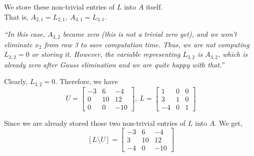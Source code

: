	We store these non-trivial entries of $L$ into $A$ itself.\\
	That is, $A_{2,1} = L_{2,1},\ A_{3,1} = L_{3,1}$.\\

\begin{commentary}
	\textit{``In this case, $A_{3,2}$ became zero (this is not a trivial zero yet), and we won't eliminate $x_2$ from row 3 to save computation time. Thus, we are not computing $L_{3,2} = 0$ or storing it. However, the variable representing $L_{3,2}$ is $A_{3,2}$, which is already zero after Gauss elimination and we are quite happy with that.''}\\
\end{commentary}

	Clearly, $L_{3,2} = 0$. Therefore, we have
	\[ U = \begin{bmatrix} -3 & 6 & -4 \\ 0 & 10 & 12 \\ 0 & 0 & -10 \end{bmatrix},\ L = \begin{bmatrix} 1 & 0 & 0 \\ 3 & 1 & 0 \\ -4 & 0 & 1 \end{bmatrix} \]

		Since we are already stored those two non-trivial entries of $L$ into $A$. We get,
	\[ [L\text{\textbackslash{}}U] = \begin{bmatrix} -3 & 6 & -4 \\ 3 & 10 & 12 \\ -4 & 0 & -10 \end{bmatrix}\]
